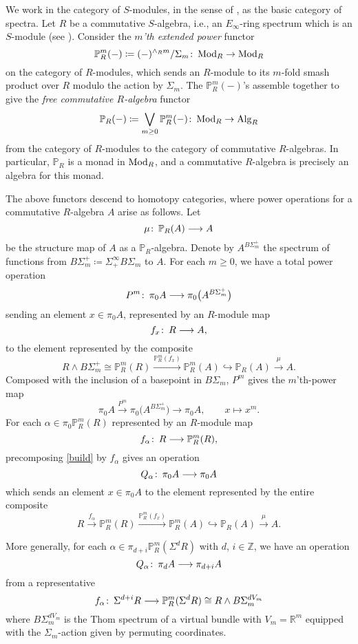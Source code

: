 \documentclass{gtpart}
\theoremstyle{definition}
\theoremstyle{remark}
\def\co{\colon\thinspace}
\newcommand{\mb}[1]{\mathbb{#1}}
\newcommand{\Mod}{{\rm Mod}}
\newcommand{\Alg}{{\rm Alg}}
\newcommand{\BP}{{\mb P}}
\newcommand{\BR}{{\mb R}}
\newcommand{\BZ}{{\mb Z}}
\newcommand{\A}{\alpha}
\newcommand{\ce}{\coloneqq}
\numberwithin{equation}{section}
\numberwithin{thm}{section}
\begin{document}
We work in the category of $S$-modules, in the sense of \cite{EKMM}, as 
the basic category of spectra.  Let $R$ be a commutative $S$-algebra, 
i.e., an $E_\infty$-ring spectrum which is an $S$-module (see 
\cite[Lemma II.3.4]{EKMM}).  Consider the {\em $m$'th extended power} 
functor 
\[
 \BP_R^m (-) \ce (-)^{\wedge_R m} / \Sigma_m \co \Mod_R \to \Mod_R 
\]
on the category of $R$-modules, which sends an $R$-module to its 
$m$-fold smash product over $R$ modulo the action by $\Sigma_m$.  The 
$\BP_R^m (-)$'s assemble together to give the {\em free commutative 
$R$-algebra} functor 
\[
 \BP_R (-) \ce \bigvee_{m \geq 0} \BP_R^m (-) \co \Mod_R \to \Alg_R 
\]
from the category of $R$-modules to the category of commutative 
$R$-algebras.  In particular, $\BP_R$ is a monad in $\Mod_R$, and a 
commutative $R$-algebra is precisely an algebra for this monad.  

The above functors descend to homotopy categories, where power 
operations for a commutative $R$-algebra $A$ arise as follows.  Let 
\[
 \mu \co \BP_R (A) \longrightarrow A 
\]
be the structure map of $A$ as a $\BP_R$-algebra.  Denote by 
$A^{B\Sigma_m^+}$ the spectrum of functions from 
$B\Sigma_m^+ \ce \Sigma_+^\infty B\Sigma_m$ to $A$.  For each $m \geq 0$, 
we have a total power operation 
\[
 P^m \co \pi_0 A \longrightarrow \pi_0 \big( A^{B\Sigma_m^+} \big) 
\]
sending an element $x \in \pi_0 A$, represented by an $R$-module map 
\[
 f_x \co R \longrightarrow A, 
\]
to the element represented by the composite 
\begin{equation}
\label{build}
 R \wedge B\Sigma_m^+ \cong \BP_R^m (R) \xrightarrow{\BP_R^m (f_x)} 
 \BP_R^m (A) \hookrightarrow \BP_R(A) \xrightarrow{\mu} A.  
\end{equation}
Composed with the inclusion of a basepoint in $B\Sigma_m$, $P^m$ gives 
the $m$'th-power map 
\[
 \pi_0 A \xrightarrow{P^m} \pi_0 \big( A^{B\Sigma_m^+} \big) \to \pi_0 A, 
 \qquad x \mapsto x^m.  
\]
For each $\A \in \pi_0 \BP_R^m (R)$ represented by an $R$-module map 
\[
 f_\A \co R \longrightarrow \BP_R^m (R), 
\]
precomposing \eqref{build} by $f_\A$ gives an operation 
\[
 Q_\A \co \pi_0 A \longrightarrow \pi_0 A 
\]
which sends an element $x \in \pi_0 A$ to the element represented by the 
entire composite 
\begin{equation}
\label{individual}
 R \xrightarrow{f_\A} \BP_R^m (R) \xrightarrow{\BP_R^m (f_x)} \BP_R^m (A) 
 \hookrightarrow \BP_R(A) \xrightarrow{\mu} A.  
\end{equation}

More generally, for each $\A \in \pi_{d+i} \BP_R^m (\Sigma^d R)$ with 
$d$, $i \in \BZ$, we have an operation 
\[
 Q_\A \co \pi_d A \longrightarrow \pi_{d+i} A 
\]
from a representative 
\begin{equation}
\label{suspensions}
 f_\A \co \Sigma^{d+i} R \longrightarrow \BP_R^m (\Sigma^d R) \cong 
 R \wedge B\Sigma_m^{dV_m} 
\end{equation}
where $B\Sigma_m^{dV_m}$ is the Thom spectrum of a virtual bundle with 
$V_m = \BR^m$ equipped with the $\Sigma_m$-action given by permuting 
coordinates.  
\end{document}
